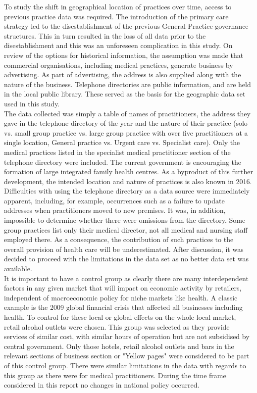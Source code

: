 \documentclass[11pt,a4paper]{article}
\begin{document}
To study the shift in geographical location of practices over time, access to previous practice data was required. The introduction of the primary care strategy led to the disestablishment of the previous General Practice governance structures. This in turn resulted in the loss of all data prior to the disestablishment and this was an unforeseen complication in this study. On review of the options for historical information, the assumption was made that commercial organisations, including medical practices, generate business by advertising. As part of advertising, the address is also supplied along with the nature of the business. Telephone directories are public information, and are held in the local public library. These served as the basis for the geographic data set used in this study.\\


The data collected was simply a table of names of practitioners, the address they gave in the telephone directory of the year and the nature of their practice (solo vs. small group practice vs. large group practice with over five practitioners at a single location, General practice vs. Urgent care vs. Specialist care). Only the medical practices listed in the specialist medical practitioner section of the telephone directory were included. The current government is encouraging the formation of large integrated family health centres. As a byproduct of this further development, the intended location and nature of practices is also known in 2016.\\


Difficulties with using the telephone directory as a data source were immediately apparent, including, for example, occurrences such as a failure to update addresses when practitioners moved to new premises. It was, in addition,  impossible to determine whether there were omissions from the directory. Some group practices list only their medical director, not all medical and nursing staff employed there. As a consequence, the contribution of such practices to the overall provision of health care will be  underestimated.  After discussion, it was decided to proceed with the limitations in the data set as no better data set was available.  \\


It is important to have a control group as clearly there are many interdependent factors in any given market that will impact on economic activity by retailers, independent of macroeconomic policy for niche markets like health. A classic example is the 2009 global financial crisis that affected all businesses including health. To control for these local or global effects on the whole local market, retail alcohol outlets were chosen.  This group was selected as they provide services of similar cost, with similar hours of operation but are not subsidised by central government. Only those hotels, retail alcohol outlets and bars in the relevant sections of business section or "Yellow pages" were considered to be part of this control group. There were similar limitations in the data with regards to this group as there were for medical practitioners. During the time frame considered in this report no changes in national policy occurred.\\
\end{document}
